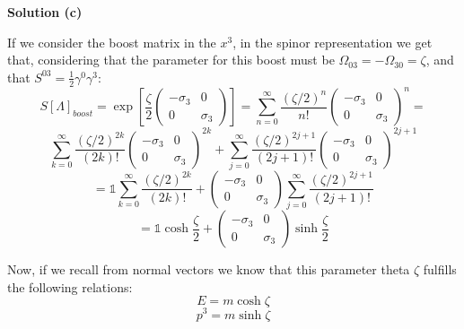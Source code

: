 \documentclass[12pt]{article}
\begin{document}
\color{blue}

\textbf{Solution (c)}

If we consider the boost matrix in the $x^3$, in the spinor representation we get that, considering that the parameter for  this boost must be $\Omega_{03}=-\Omega_{30}=\zeta$, and that $S^{03}= \frac{1}{2}\gamma^0\gamma^3$:
\[
    S[\Lambda]_{boost}=\exp{\left[\frac{\zeta}{2}
    \begin{pmatrix}
        -\sigma_3 & 0 \\
        0 & \sigma_3
\end{pmatrix}\right]} = \sum_{n=0}^\infty \frac{(\zeta/2)^n}{n!}\begin{pmatrix}
        -\sigma_3 & 0 \\
        0 & \sigma_3
    \end{pmatrix}^n = 
\]
\[
    \sum_{k=0}^\infty \frac{(\zeta/2)^{2k}}{(2k)!}\begin{pmatrix}
        -\sigma_3 & 0 \\
        0 & \sigma_3
        \end{pmatrix}^{2k} + \sum_{j=0}^\infty \frac{(\zeta/2)^{2j+1}}{(2j+1)!}\begin{pmatrix}
        -\sigma_3 & 0 \\
        0 & \sigma_3
    \end{pmatrix}^{2j+1} 
\]
\[
    = \mathbb{1}\sum_{k=0}^\infty \frac{(\zeta/2)^{2k}}{(2k)!} + \begin{pmatrix}
        -\sigma_3 & 0 \\
        0 & \sigma_3
    \end{pmatrix}\sum_{j=0}^\infty \frac{(\zeta/2)^{2j+1}}{(2j+1)!}
\]
\[
    = \mathbb{1}\cosh{\frac{\zeta}{2}} + \begin{pmatrix}
        -\sigma_3 & 0 \\
        0 & \sigma_3
    \end{pmatrix}\sinh{\frac{\zeta}{2}}
\]

Now, if we recall from normal vectors we know that this parameter theta $\zeta$ fulfills the following relations:
\[
    E = m\cosh{\zeta}
\]
\[
    p^3 = m\sinh{\zeta}
\]
\end{document}
